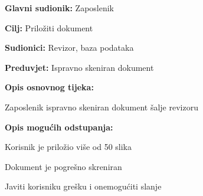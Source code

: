 				\noindent {}
				\begin{packed_item}
					
					\item \textbf{Glavni sudionik:} Zaposlenik
					\item  \textbf{Cilj:} Priložiti dokument
					\item  \textbf{Sudionici:} Revizor, baza podataka
					\item  \textbf{Preduvjet:} Ispravno skeniran dokument
					\item  \textbf{Opis osnovnog tijeka:}
					
					\item[] \begin{packed_enum}
						
						
						\item Zaposlenik ispravno skeniran dokument šalje revizoru
						\item 
					\end{packed_enum}
					
					\item  \textbf{Opis mogućih odstupanja:}
					
					\item[] \begin{packed_item}
						
						\item[2.a] Korisnik je priložio više od 50 slika
						\item[2.b] Dokument je pogrešno skreniran
						\item[] \begin{packed_enum}
							
							\item Javiti korisniku grešku i onemogućiti slanje
							
						\end{packed_enum}
						
					\end{packed_item}
				\end{packed_item}
				
